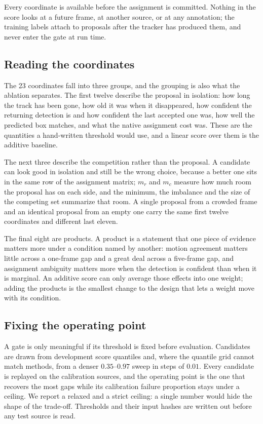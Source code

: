 Every coordinate is available before the assignment is committed. Nothing
in the score looks at a future frame, at another source, or at any
annotation; the training labels attach to proposals after the tracker has
produced them, and never enter the gate at run time.



\subsection{Reading the coordinates}

The 23 coordinates fall into three groups, and the grouping is also what
the ablation separates. The first twelve describe the proposal in
isolation: how long the track has been gone, how old it was when it
disappeared, how confident the returning detection is and how confident the
last accepted one was, how well the predicted box matches, and what the
native assignment cost was. These are the quantities a hand-written
threshold would use, and a linear score over them is the additive baseline.

The next three describe the competition rather than the proposal. A
candidate can look good in isolation and still be the wrong choice, because
a better one sits in the same row of the assignment matrix; $m_r$ and $m_c$
measure how much room the proposal has on each side, and the minimum, the
imbalance and the size of the competing set summarize that room. A single
proposal from a crowded frame and an identical proposal from an empty one
carry the same first twelve coordinates and different last eleven.

The final eight are products. A product is a statement that one piece of
evidence matters more under a condition named by another: motion agreement
matters little across a one-frame gap and a great deal across a five-frame
gap, and assignment ambiguity matters more when the detection is confident
than when it is marginal. An additive score can only average those effects
into one weight; adding the products is the smallest change to the design
that lets a weight move with its condition.

\subsection{Fixing the operating point}

A gate is only meaningful if its threshold is fixed before evaluation.
Candidates are drawn from development score quantiles and, where the
quantile grid cannot match methods, from a denser $0.35$--$0.97$ sweep in
steps of $0.01$. Every candidate is replayed on the calibration sources,
and the operating point is the one that recovers the most gaps while its
calibration failure proportion stays under a ceiling. We report a relaxed
and a strict ceiling: a single number would hide the shape of the
trade-off. Thresholds and their input hashes are written out before any
test source is read.

